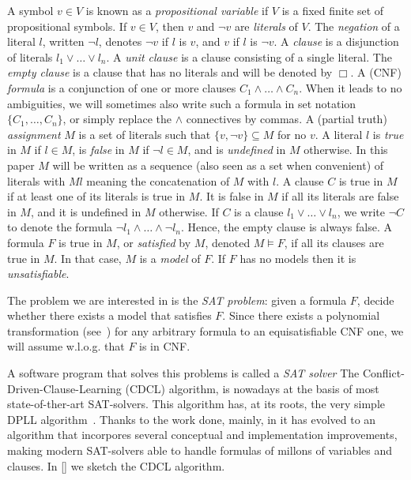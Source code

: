 \documentclass{llncs}
\begin{document}
A symbol $v \in V $ is known as a \emph{propositional variable} if $V$ is
 a fixed finite set of propositional symbols.  If $v \in V$,
then $v$ and $\lnot v$ are \emph{literals} of $V$.  
The \emph{negation} of a literal $l$, written $\lnot l$, denotes 
$\lnot v$ if $l$ is $v$, and $v$ if $l$ is $\lnot v$.
A \emph{clause} is a disjunction of literals $l_1 \lor\ldots\lor l_n$.
A \emph{unit clause} is a clause consisting of a single literal.  The
\emph{empty clause} is a clause that has no literals and will be
denoted by $\Box$.  A (CNF) \emph{formula} is a conjunction of one or
more clauses $C_1 \land\ldots\land C_n$. When it leads to no
ambiguities, we will sometimes also write such a formula in set
notation $\{C_1,\ldots,C_n\}$, or simply replace the $\land$
connectives by commas.  A (partial truth) \emph{assignment} $M$ is a
set of literals such that $\{ v, \lnot v \} \subseteq M$ for no $v$. A
literal $l$ is \emph{true} in $M$ if $l \in M$, is \emph{false} in $M$
if $\lnot l \in M$, and is \emph{undefined} in $M$ otherwise.  In this
paper $M$ will be written as a sequence (also seen as a set when
convenient) of literals with $M l$ meaning the concatenation of $M$
with $l$.   A clause $C$ is true in $M$ if at least one of its
literals is true in $M$.  It is false in $M$ if all its literals are
false in $M$, and it is undefined in $M$ otherwise. 
If $C$ is a clause $l_1
\lor\ldots\lor l_n$, we write $\lnot C$ to denote the formula $\lnot
l_1 \land\ldots\land \lnot l_n$.
Hence, the empty
clause is always false.  A formula $F$ is true in $M$, or
\emph{satisfied} by $M$, denoted $M\models F$, if all its clauses are
true in $M$.  In that case, $M$ is a \emph{model} of $F$.  If $F$ has
no models then it is \emph{unsatisfiable}.  

The problem we are interested in is the \emph{SAT problem}: given a
formula $F$, decide whether there exists a model that satisfies
$F$.
Since there exists a polynomial transformation
(see~\cite{Tseitin1968}) for any arbitrary formula to an
equisatisfiable CNF one, we will assume w.l.o.g. that $F$ is in CNF.

A software program that solves this problems is called a \emph{SAT solver}
The Conflict-Driven-Clause-Learning (CDCL) algorithm, is nowadays at the 
basis of most state-of-ther-art SAT-solvers\cite{EenSorensson2003SAT,
picosat2008,rsat,siege, plingeling}. This algorithm has, at its roots, the very 
simple DPLL algorithm~\cite{Davisetal1962CACM}. Thanks to the work done, mainly,
 in \cite{relsat,Chaff2001, GRASP1999IEEE, ZhangStickel1996IMATH} it has evolved
 to an algorithm that incorpores several conceptual and implementation 
improvements, making modern SAT-solvers able to handle formulas of millons 
of variables and clauses. In \ref{} we sketch the CDCL algorithm.
\end{document}
